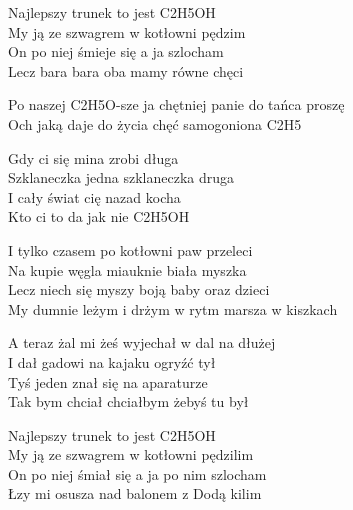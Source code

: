 \begin{text}
    Najlepszy trunek to jest C2H5OH\\
    My ją ze szwagrem w kotłowni pędzim\\
    On po niej śmieje się a ja szlocham\\
    Lecz bara bara oba mamy równe chęci

    Po naszej C2H5O-sze ja chętniej panie do tańca proszę\\
    Och jaką daje do życia chęć samogoniona C2H5

    Gdy ci się mina zrobi długa\\
    Szklaneczka jedna szklaneczka druga\\
    I cały świat cię nazad kocha\\
    Kto ci to da jak nie C2H5OH

    I tylko czasem po kotłowni paw przeleci\\
    Na kupie węgla miauknie biała myszka\\
    Lecz niech się myszy boją baby oraz dzieci\\
    My dumnie leżym i drżym w rytm marsza w kiszkach

    A teraz żal mi żeś wyjechał w dal na dłużej\\
    I dał gadowi na kajaku ogryźć tył\\
    Tyś jeden znał się na aparaturze\\
    Tak bym chciał chciałbym żebyś tu był

    Najlepszy trunek to jest C2H5OH\\
    My ją ze szwagrem w kotłowni pędzilim\\
    On po niej śmiał się a ja po nim szlocham\\
    Łzy mi osusza nad balonem z Dodą kilim
\end{text}
\begin{chord}

\end{chord}